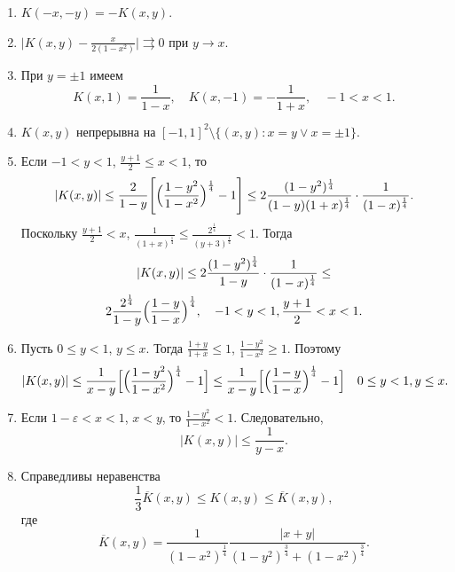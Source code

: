 \begin{enumerate}
\item $K(-x,-y)=-K(x,y)$.

\item
$\bigl|K(x,y)-\frac{x}{2(1-x^2)}\bigr|\rightrightarrows0$ при $y\rightarrow x$.

\item
При $y=\pm 1$ имеем
\begin{equation*}
K(x, 1) = \frac{1}{1-x}, \quad K(x,- 1) = -\frac{1}{1+x}, \quad -1 < x < 1.
\end{equation*}

\item $K(x,y)$ непрерывна на $[-1,1]^2 \setminus \{ (x,y): x=y \lor x=\pm 1  \}$.

\item
Если $-1 < y < 1$, $\frac{y+1}{2} \le x < 1$, то
\begin{equation*}
|K(x,y)| \le \frac{2}{1-y}\Biggl[ \Bigl(\frac{1-y^2}{1-x^2} \Bigr)^\frac14 - 1 \Biggr] \le 2\frac{(1-y^2)^\frac14}{(1-y)(1+x)^\frac14} \cdot \frac{1}{(1-x)^\frac14}.
\end{equation*}
Поскольку $\frac{y+1}{2} < x$, $\frac{1}{(1+x)^\frac14} \le \frac{2^\frac14}{(y+3)^\frac14} < 1$. Тогда
\begin{multline}\label{K-est-all-y}
|K(x,y)| \le 2\frac{(1-y^2)^\frac14}{1-y} \cdot \frac{1}{(1-x)^\frac14} \le \\
2 \frac{2^\frac14}{1-y} \Bigl( \frac{1-y}{1-x} \Bigr)^\frac14
, \quad -1 < y < 1, \frac{y+1}{2} < x < 1.
\end{multline}

\item
Пусть $0 \le y < 1$, $y \le x$. Тогда $\frac{1+y}{1+x} \le 1$, $\frac{1-y^2}{1-x^2} \ge 1$. Поэтому
\begin{equation}\label{K-est-y-less-x}
|K(x,y)| \le \frac{1}{x-y}\Bigl[\Bigl(\frac{1-y^2}{1-x^2}\Bigr)^\frac14 - 1\Bigr] \le
\frac{1}{x-y}\Bigl[\Bigl(\frac{1-y}{1-x}\Bigr)^\frac14 - 1\Bigr]
\quad
0 \le y < 1, y \le x.
\end{equation}

\item
Если $1-\varepsilon < x < 1$, $x < y$, то $\frac{1-y^2}{1-x^2}<1$. Следовательно,
\begin{equation}\label{K-est-x-less-y}
|K(x,y)|\le\frac{1}{y-x}.
\end{equation}

\item
Справедливы неравенства \cite[формула (5.20)]{tad-SHII-Leg}
\begin{equation}\label{overK-est}
\frac13 \overline{K}(x,y)\le K(x,y)\le\overline{K}(x,y),
\end{equation}
где
$$
\overline{K}(x,y)=\frac{1}{(1-x^2)^{\frac14}}\frac{|x+y|}{(1-y^2)^{\frac34}+(1-x^2)^{\frac34}}.
$$
\end{enumerate}

